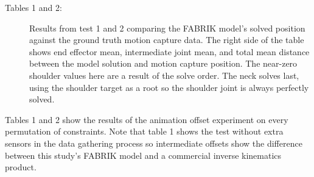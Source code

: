 \documentclass[10pt,twocolumn]{article}
\begin{document}
\begin{table}[]
\caption{Test 2 Results}
\begin{description}
    \item[Tables 1 and 2:] Results from test 1 and 2 comparing the FABRIK model's solved position against the ground truth motion capture data. The right side of the table shows end effector mean, intermediate joint mean, and total mean distance between the model solution and motion capture position. The near-zero shoulder values here are a result of the solve order. The neck solves last, using the shoulder target as a root so the shoulder joint is always perfectly solved.
\end{description}
\end{table}

Tables 1 and 2 show the results of the animation offset experiment on every permutation of constraints. Note that table 1 shows the test without extra sensors in the data gathering process so intermediate offsets show the difference between this study’s FABRIK model and a commercial inverse kinematics product.
\end{document}
